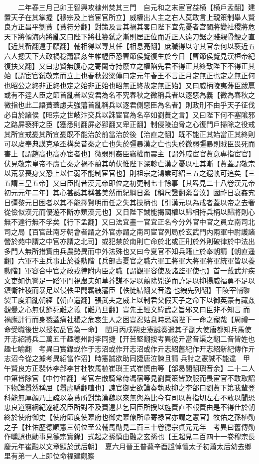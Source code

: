 　　二年春三月己卯王智興攻棣州焚其三門　自元和之末宦官益横【横戶孟翻】建置天子在其掌握【穆宗及上皆宦官所立】威權出人主之右人莫敢言上親策制舉人賢良方正昌平劉蕡【蕡符分翻】對策及言其禍其畧曰陛下宜先憂者宫闈將變社稷將危天下將傾海内將亂又曰陛下將杜篡弑之漸則居正位而近正人遠刀鋸之賤親骨鯁之直【近其靳翻遠于願翻】輔相得以專其任【相息亮翻】庶職得以守其官奈何以䙝近五六人摠天下大政禍稔蕭牆姦生帷幄臣恐曹節侯覽復生於今日【曹節侯覽見漢桓帝紀復扶又翻】又曰忠賢無腹心之寄閽寺持廢立之權陷先君不得正其終致陛下不得正其始【謂宦官弑敬宗而立上也春秋穀梁傳曰定元年春王不言正月定無正也定之無正何也昭公之終非正終也定之始非正始也昭無正終故定無正始】又曰威柄陵夷藩臣跋扈或有不逹人臣之節首亂者以安君為名不究春秋之微稱兵者以逐惡為義【微為春秋之微指也此二語蕡蓋慮夫強藩首亂稱兵以逐君側惡臣為名者】則政刑不由乎天子征伐必自於諸侯【昭宗之世岐汴交兵以誅宦官為名卒如劉蕡之言】又曰陛下何不塞隂邪之路屏䙝狎之臣【塞悉則翻屏必郢翻又卑正翻】制侵陵迫脅之心復門戶掃除之役戒其所宜戒憂其所宜憂既不能治於前當治於後【治直之翻】既不能正其始當正其終則可以䖍奉典謨克承丕構矣昔秦之亡也失於彊暴漢之亡也失於微弱彊暴則賊臣畏死而害上【謂趙高也高亦宦者也】微弱則姦臣竊權而震主【謂外戚宦官蕡意專指宦官】伏見敬宗皇帝不虞亡秦之禍不翦其萌伏惟陛下深軫亡漢之憂以杜其漸【蕡蓋謂敬宗以荒暴喪身又恐上以仁弱不能制宦官也】則祖宗之鴻業可紹三五之遐軌可追矣【三五謂三皇五帝】又曰臣聞昔漢元帝即位之初更制七十餘事【其畧見二十八卷漢元帝初元元年二年】其心甚誠其稱甚美然而紀綱日紊【稱尺證翻紊音汶】國祚日衰姦宄日彊黎元日困者以其不能擇賢明而任之失其操柄也【引漢元以為戒者蓋以帝之去奢從儉似漢元而優遊不斷亦類漢元也】又日陛下誠能揭國權以歸相持兵柄以歸將則心無不達行無不孚矣【行下孟翻】又曰法宜畫一官宜正名今分外官中官之員立南司北司之局【百官赴南牙朝會者謂之外官亦謂之南司宦官列局於玄武門内兩軍中尉護諸營於苑中謂之中官亦謂之北司】或犯禁於南則亡命於北或正刑於外則破律於中法出多門人無所措實由兵農勢異而中外法殊也又曰今夏官不知兵籍止於奉朝請【朝直遥翻】六軍不主兵事止於養勲階【兵部古夏官之職六軍工將軍大將軍將軍統軍皆以養勲階】軍容合中官之政戎律附内臣之職【謂觀軍容使及諸監軍使也】首一戴武弁疾文吏如仇讐足一蹈軍門視農夫如草芥謀不足以翦除兇逆而詐足以抑揚威福勇不足以鎮衛社稷而暴足以侵軼里閭羈絏藩臣【軼徒結翻又音逸也絏先列翻】干陵宰輔隳裂王度汨亂朝經【朝直遥翻】張武夫之威上以制君父假天子之命下以御英豪有藏姦觀釁之心無仗節死難之義【難乃旦翻】豈先王經文緯武之旨邪又曰臣非不知言而禍應計行而身戮蓋痛社稷之危哀生人之困豈忍姑息時忌竊陛下一命之寵哉【周禮一命受職後世以授初品官為一命】　閏月丙戌朔史憲誠奏遣其子副大使唐都知兵馬使开志紹將兵二萬五千趣德州討李同捷【开苦堅翻按考異從亓當音渠之翻二音皆姓也趣七喻翻　考異曰實錄或作于志沼或作开志沼或作亓志紹舊紀作开志紹新紀傳作亓志沼今從之據考異紹當作沼】時憲誠欲助同捷唐泣諫且請兵討之憲誠不能違　甲午賢良方正裴休李郃李甘杜牧馬植崔璵王式崔慎由等【郃曷閣翻璵音余】二十二人中第皆除官【中竹仲翻】考官左散騎常侍馮宿等見劉蕡策皆歎服而畏宦官不敢取詔下物論囂然稱屈【囂虚驕翻喧也】諫官御史欲論奏執政抑之李郃曰劉蕡下第我輩登科能無厚顔乃上疏以為蕡所對策漢魏以來無與為比今有司以蕡指切左右不敢以聞恐忠良道窮綱紀遂絶况臣所對不及蕡遠甚乞回臣所授以旌蕡直不報蕡由是不得仕於朝終於使府御史【使府節度使幕府也御史幕僚所帶寄禄官亦謂之憲官】牧佑之孫植勛之子【杜佑歷德順憲三朝位至公輔馬勛見二百三十卷德宗貞元元年　考異曰舊傳勛作曛誤也勛事見德宗實錄】式起之孫慎由融之玄孫也【王起見二百四十一卷穆宗長慶元年崔融以文章顯於武后朝】　夏六月晉王普薨辛酉諡悼懷太子初蕭太后幼去鄉里有弟一人上即位命福建觀察

